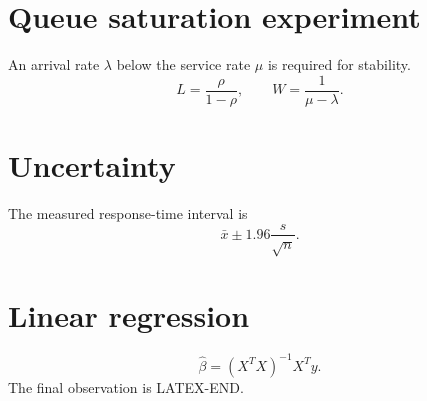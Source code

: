 \documentclass{article}
\begin{document}
\section{Queue saturation experiment}
An arrival rate $\lambda$ below the service rate $\mu$ is required for stability.
\[ L = \frac{\rho}{1-\rho}, \qquad W = \frac{1}{\mu-\lambda}. \]
\section{Uncertainty}
The measured response-time interval is
\[ \bar{x} \pm 1.96\frac{s}{\sqrt{n}}. \]
\section{Linear regression}
\[ \hat{\beta} = (X^T X)^{-1}X^T y. \]
The final observation is LATEX-END.
\end{document}
